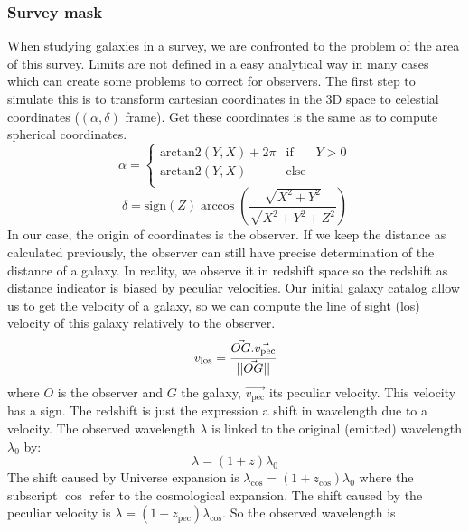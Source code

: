\subsubsection{Survey mask}
%
When studying galaxies in a survey, we are confronted to the problem of the
area of this survey. Limits are not defined in a easy analytical way in many
cases which can create some problems to correct for observers. The first step
to simulate this is to transform cartesian coordinates in the 3D space to
celestial coordinates ($(\alpha,\delta)$ frame). Get these coordinates is the
same as to compute spherical coordinates.
%
\begin{equation}
    \alpha=\left\{ \begin{array}{lcr}
     \mbox{arctan2}(Y,X)+2\pi & \mbox{if} & Y>0 \\
     \mbox{arctan2}(Y,X) & \mbox{else} & \\
    \end{array}\right.\nonumber%
\end{equation}
%
\begin{equation}
    \delta=\mbox{sign}(Z)\arccos\left(\frac{\sqrt{X^2+Y^2}}{\sqrt{X^2+Y^2+Z^2}}\right)
\end{equation}
%
In our case, the origin of coordinates is the observer. If we keep the distance
as calculated previously, the observer can still have precise determination of
the distance of a galaxy. In reality, we observe it in redshift space so the
redshift as distance indicator is biased by peculiar velocities. Our initial
galaxy catalog allow us to get the velocity of a galaxy, so we can compute the
line of sight (los) velocity of this galaxy relatively to the observer.
%
\begin{equation}
    v_{\mathrm{los}}=\cfrac{\vec{OG}.\vec{v_{\mathrm{pec}}}}{||\vec{OG}||}
\end{equation}
%
where $O$ is the observer and $G$ the galaxy, $\vec{v_{\mathrm{pec}}}$ its
peculiar velocity. This velocity has a sign. The redshift is just the
expression a shift in wavelength due to a velocity. The observed wavelength
$\lambda$ is linked to the original (emitted) wavelength $\lambda_0$ by:
%
\begin{equation}
    \lambda=(1+z)\lambda_0
\end{equation}
%
The shift caused by Universe expansion is
$\lambda_{\cos}=(1+z_{\cos})\lambda_0$ where the subscript
$\cos$ refer to the cosmological expansion. The shift caused by the
peculiar velocity is $\lambda=(1+z_{\mathrm{pec}})\lambda_{\cos}$. So
the observed wavelength is
